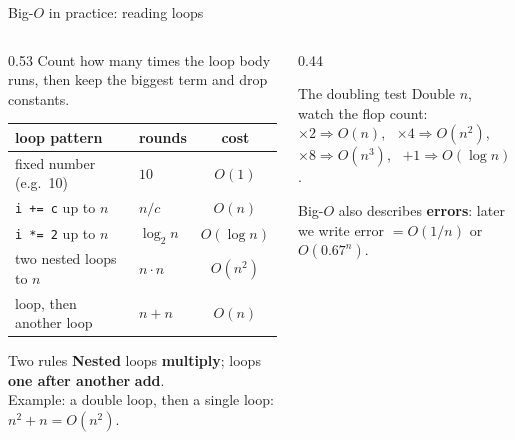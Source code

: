 \documentclass[aspectratio=169]{beamer}
\begin{document}
\begin{frame}{Big-$O$ in practice: reading loops}
\begin{columns}[T]
\begin{column}{0.53\textwidth}
\small
Count how many times the loop body runs, then keep the biggest term and drop constants.

\vspace{0.2cm}
\footnotesize
\begin{tabular}{@{}llc@{}}
\toprule
loop pattern & rounds & cost \\
\midrule
fixed number (e.g.\ 10) & $10$ & $O(1)$ \\
\texttt{i += c} up to $n$ & $n/c$ & $O(n)$ \\
\texttt{i *= 2} up to $n$ & $\log_2 n$ & $O(\log n)$ \\
two nested loops to $n$ & $n \cdot n$ & $O(n^2)$ \\
loop, then another loop & $n + n$ & $O(n)$ \\
\bottomrule
\end{tabular}

\vspace{0.3cm}
\begin{block}{Two rules}
\footnotesize
\textbf{Nested} loops \textbf{multiply}; loops \textbf{one after another} \textbf{add}.\\[2pt]
Example: a double loop, then a single loop: $n^2 + n = O(n^2)$.
\end{block}
\end{column}

\begin{column}{0.44\textwidth}
\centering
{}

\vspace{0.1cm}
\begin{block}{The doubling test}
\scriptsize
Double $n$, watch the flop count:\\
$\times2 \Rightarrow O(n)$, \ $\times4 \Rightarrow O(n^2)$, \ $\times8 \Rightarrow O(n^3)$, \ $+1 \Rightarrow O(\log n)$.
\end{block}

\vspace{0.1cm}
\scriptsize Big-$O$ also describes \textbf{errors}: later we write error $= O(1/n)$ or $O(0.67^n)$.
\end{column}
\end{columns}
\end{frame}
\end{document}
